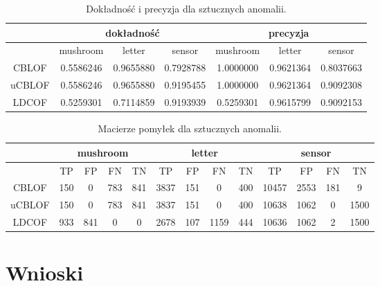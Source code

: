 \documentclass[11pt,a4paper,twoside]{article}
\begin{document}
\begin{table}[ht]
\centering
\caption{Dokładność i precyzja dla sztucznych anomalii.}
\label{accPrec_v2}
\begin{tabular}{|*{7}{c|}}
\hline
 & \multicolumn{3}{c|}{dokładność} & \multicolumn{3}{c|}{precyzja} \\\hline
 & mushroom & letter & sensor & mushroom & letter & sensor \\\hline
 CBLOF &     0.5586246    &     0.9655880   &    0.7928788   &  1.0000000  &   0.9621364  &    0.8037663   \\\hline
 uCBLOF & 0.5586246   &      0.9655880    &   0.9195455   &   1.0000000  &   0.9621364   &  0.9092308   \\\hline
 LDCOF &    0.5259301    &      0.7114859    &   0.9193939   &  0.5259301  &   0.9615799   &   0.9092153   \\\hline
\end{tabular}
\end{table}


\begin{table}[ht]
\centering
\caption{Macierze pomyłek dla sztucznych anomalii.}
\label{confMatrix_v1}
\begin{tabular}{|*{13}{c|}}
\hline
 & \multicolumn{4}{c|}{mushroom} & \multicolumn{4}{c|}{letter} & \multicolumn{4}{c|}{sensor} \\\hline
 & TP & FP & FN & TN  & TP & FP & FN & TN  & TP & FP & FN & TN \\\hline
 CBLOF &    150   &   0        &    783    &        841          &   3837   &   151     &  0      &  400  &   10457    &  2553     &   181  &  9  \\\hline
 uCBLOF &  150    &   0        &   783    &       841         &   3837   &   151     &  0       & 400  &   10638  &   1062    &   0   &  1500 \\\hline
 LDCOF &    933   &    841    &    0      &        0           &   2678   &   107     &  1159  & 444  &   10636   &  1062 &   2       &   1500      \\\hline
\end{tabular}
\end{table}


\section {Wnioski}
\end{document}
